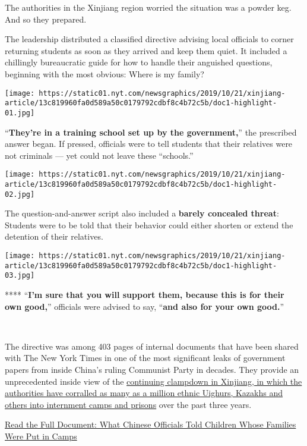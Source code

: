 The authorities in the Xinjiang region worried the situation was a
powder keg. And so they prepared.

The leadership distributed a classified directive advising local
officials to corner returning students as soon as they arrived and keep
them quiet. It included a chillingly bureaucratic guide for how to
handle their anguished questions, beginning with the most obvious: Where
is my family?

\texttt{[image: https://static01.nyt.com/newsgraphics/2019/10/21/xinjiang-article/13c819960fa0d589a50c0179792cdbf8c4b72c5b/doc1-highlight-01.jpg]}

``\textbf{They're in a training school set up by the government,}'' the
prescribed answer began. If pressed, officials were to tell students
that their relatives were not criminals --- yet could not leave these
``schools.''

\texttt{[image: https://static01.nyt.com/newsgraphics/2019/10/21/xinjiang-article/13c819960fa0d589a50c0179792cdbf8c4b72c5b/doc1-highlight-02.jpg]}

The question-and-answer script also included a \textbf{barely concealed
threat}: Students were to be told that their behavior could either
shorten or extend the detention of their relatives.

\texttt{[image: https://static01.nyt.com/newsgraphics/2019/10/21/xinjiang-article/13c819960fa0d589a50c0179792cdbf8c4b72c5b/doc1-highlight-03.jpg]}

 **** ``\textbf{I'm sure that you will support them, because this is for
their own good,}'' officials were advised to say, ``\textbf{and also for
your own good.}''

​

The directive was among 403 pages of internal documents that have been
shared with The New York Times in one of the most significant leaks of
government papers from inside China's ruling Communist Party in decades.
They provide an unprecedented inside view of the
\href{https://www.nytimes.com/2018/09/08/world/asia/china-uighur-muslim-detention-camp.html}{continuing
clampdown in Xinjiang, in which the authorities have corralled as many
as a million ethnic Uighurs, Kazakhs and others into internment camps
and prisons} over the past three years.

\href{https://www.nytimes.com/interactive/2019/11/16/world/asia/china-detention-directive.html}{Read
the Full Document: What Chinese Officials Told Children Whose Families
Were Put in Camps}

